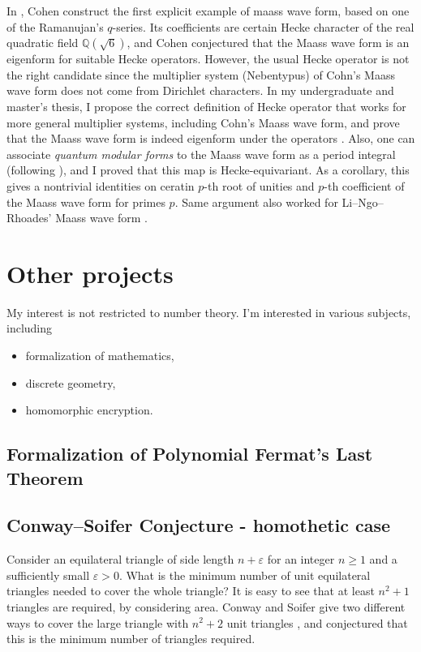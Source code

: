 \documentclass[12pt]{article}
\begin{document}
In \cite{cohen1988q}, Cohen construct the first explicit example of maass wave form, based on one of the Ramanujan's $q$-series.
Its coefficients are certain Hecke character of the real quadratic field $\mathbb{Q}(\sqrt{6})$, and Cohen conjectured that the Maass wave form is an eigenform for suitable Hecke operators.
However, the usual Hecke operator is not the right candidate since the multiplier system (Nebentypus) of Cohn's Maass wave form does not come from Dirichlet characters.
In my undergraduate and master's thesis, I propose the correct definition of Hecke operator that works for more general multiplier systems, including Cohn's Maass wave form, and prove that the Maass wave form is indeed eigenform under the operators \cite{lee2018quantum,lee2019maass}.
Also, one can associate \emph{quantum modular forms} to the Maass wave form as a period integral (following \cite{lewis2001period,zagier2010quantum}), and I proved that this map is Hecke-equivariant.
As a corollary, this gives a nontrivial identities on ceratin $p$-th root of unities and $p$-th coefficient of the Maass wave form for primes $p$.
Same argument also worked for Li--Ngo--Rhoades' Maass wave form \cite{li2013renormalization}.



\newpage
\section*{Other projects}

My interest is not restricted to number theory. I'm interested in various subjects, including
\begin{itemize}
    \item formalization of mathematics,
    \item discrete geometry,
    \item homomorphic encryption.
\end{itemize}




\subsection*{Formalization of Polynomial Fermat's Last Theorem}

\subsection*{Conway--Soifer Conjecture - homothetic case}

Consider an equilateral triangle of side length $n + \varepsilon$ for an integer $n \geq 1$ and a sufficiently small $\varepsilon > 0$.
What is the minimum number of unit equilateral triangles needed to cover the whole triangle?
It is easy to see that at least $n^2 + 1$ triangles are required, by considering area.
Conway and Soifer give two different ways to cover the large triangle with $n^2 + 2$ unit triangles \cite{conway2005covering}, and conjectured that this is the minimum number of triangles required.
\end{document}
